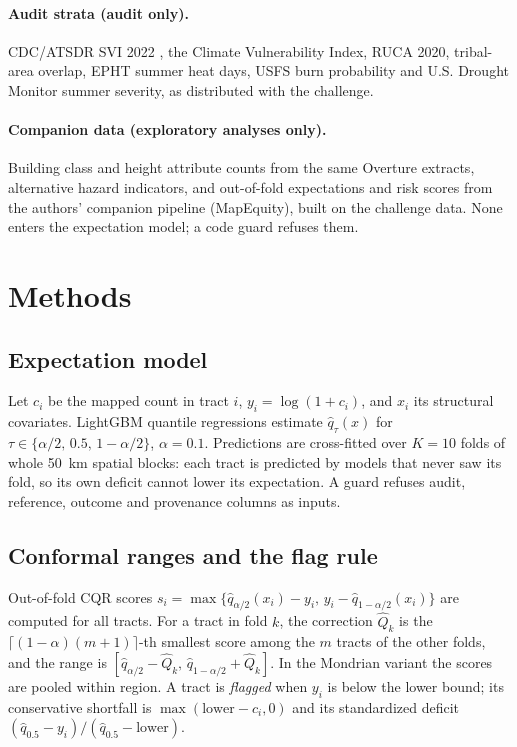 \documentclass[11pt]{article}
\begin{document}
\paragraph{Audit strata (audit only).} CDC/ATSDR SVI 2022 \citep{flanagan2011}, the Climate Vulnerability Index, RUCA 2020, tribal-area overlap, EPHT summer heat days, USFS burn probability \citep{wrc} and U.S. Drought Monitor summer severity, as distributed with the challenge.

\paragraph{Companion data (exploratory analyses only).} Building class and height attribute counts from the same Overture extracts, alternative hazard indicators, and out-of-fold expectations and risk scores from the authors' companion pipeline (MapEquity), built on the challenge data. None enters the expectation model; a code guard refuses them.

\section{Methods}

\subsection{Expectation model}
Let $c_i$ be the mapped count in tract $i$, $y_i=\log(1+c_i)$, and $x_i$ its structural covariates. LightGBM \citep{ke2017} quantile regressions estimate $\hat q_\tau(x)$ for $\tau\in\{\alpha/2,\,0.5,\,1-\alpha/2\}$, $\alpha=0.1$. Predictions are cross-fitted over $K=10$ folds of whole \SI{50}{km} spatial blocks: each tract is predicted by models that never saw its fold, so its own deficit cannot lower its expectation. A guard refuses audit, reference, outcome and provenance columns as inputs.

\subsection{Conformal ranges and the flag rule}\label{sec:conformal}
Out-of-fold CQR scores $s_i=\max\{\hat q_{\alpha/2}(x_i)-y_i,\, y_i-\hat q_{1-\alpha/2}(x_i)\}$ are computed for all tracts. For a tract in fold $k$, the correction $\hat Q_k$ is the $\lceil(1-\alpha)(m+1)\rceil$-th smallest score among the $m$ tracts of the other folds, and the range is $[\hat q_{\alpha/2}-\hat Q_k,\, \hat q_{1-\alpha/2}+\hat Q_k]$. In the Mondrian variant the scores are pooled within region. A tract is \emph{flagged} when $y_i$ is below the lower bound; its conservative shortfall is $\max(\text{lower}-c_i,0)$ and its standardized deficit $(\hat q_{0.5}-y_i)/(\hat q_{0.5}-\text{lower})$.
\end{document}
